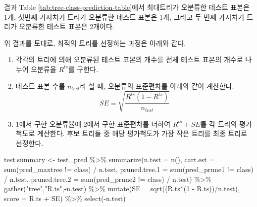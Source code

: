 \documentclass[
]{book}
\newenvironment{Shaded}{\begin{snugshade}}{\end{snugshade}}
\newcommand{\AttributeTok}[1]{\textcolor[rgb]{0.77,0.63,0.00}{#1}}
\newcommand{\DecValTok}[1]{\textcolor[rgb]{0.00,0.00,0.81}{#1}}
\newcommand{\FunctionTok}[1]{\textcolor[rgb]{0.00,0.00,0.00}{#1}}
\newcommand{\NormalTok}[1]{#1}
\newcommand{\OtherTok}[1]{\textcolor[rgb]{0.56,0.35,0.01}{#1}}
\newcommand{\SpecialCharTok}[1]{\textcolor[rgb]{0.00,0.00,0.00}{#1}}
\newcommand{\StringTok}[1]{\textcolor[rgb]{0.31,0.60,0.02}{#1}}
\providecommand{\tightlist}{%
  \setlength{\itemsep}{0pt}\setlength{\parskip}{0pt}}
\begin{document}
결과 Table \ref{tab:tree-class-prediction-table}에서 최대트리가 오분류한 테스트 표본은 1개, 첫번째 가지치기 트리가 오분류한 테스트 표본은 1개, 그리고 두 번째 가지치기 트리가 오분류한 테스트 표본은 2개이다.

위 결과를 토대로, 최적의 트리를 선정하는 과정은 아래와 같다.

\begin{enumerate}
\def\labelenumi{\arabic{enumi}.}
\tightlist
\item
  각각의 트리에 의해 오분류된 테스트 표본의 개수를 전체 테스트 표본의 개수로 나누어 오분류율 \(R^{ts}\)를 구한다.
\item
  테스트 표본 수를 \(n_{test}\)라 할 때, 오분류의 표준편차를 아래와 같이 계산한다.
  \[SE = \sqrt{\frac{R^{ts}(1 - R^{ts})}{n_{test}}}\]
\item
  1에서 구한 오분류율에 2에서 구한 표준편차를 더하여 \(R^{ts} + SE\)를 각 트리의 평가척도로 계산한다. 후보 트리들 중 해당 평가척도가 가장 작은 트리를 최종 트리로 선정한다.
\end{enumerate}

\begin{Shaded}
\begin{Highlighting}[]
\NormalTok{test.summary }\OtherTok{\textless{}{-}}\NormalTok{ test\_pred }\SpecialCharTok{\%\textgreater{}\%}
  \FunctionTok{summarize}\NormalTok{(}\AttributeTok{n.test =} \FunctionTok{n}\NormalTok{(),}
            \AttributeTok{cart.est =} \FunctionTok{sum}\NormalTok{(pred\_maxtree }\SpecialCharTok{!=}\NormalTok{ class) }\SpecialCharTok{/}\NormalTok{ n.test,}
            \AttributeTok{pruned.tree.1 =} \FunctionTok{sum}\NormalTok{(pred\_prune1 }\SpecialCharTok{!=}\NormalTok{ class) }\SpecialCharTok{/}\NormalTok{ n.test,}
            \AttributeTok{pruned.tree.2 =} \FunctionTok{sum}\NormalTok{(pred\_prune2 }\SpecialCharTok{!=}\NormalTok{ class) }\SpecialCharTok{/}\NormalTok{ n.test) }\SpecialCharTok{\%\textgreater{}\%}
  \FunctionTok{gather}\NormalTok{(}\StringTok{"tree"}\NormalTok{,}\StringTok{"R.ts"}\NormalTok{,}\SpecialCharTok{{-}}\NormalTok{n.test) }\SpecialCharTok{\%\textgreater{}\%}
  \FunctionTok{mutate}\NormalTok{(}\AttributeTok{SE =} \FunctionTok{sqrt}\NormalTok{((R.ts}\SpecialCharTok{*}\NormalTok{(}\DecValTok{1} \SpecialCharTok{{-}}\NormalTok{ R.ts))}\SpecialCharTok{/}\NormalTok{n.test),}
         \AttributeTok{score =}\NormalTok{ R.ts }\SpecialCharTok{+}\NormalTok{ SE) }\SpecialCharTok{\%\textgreater{}\%}
  \FunctionTok{select}\NormalTok{(}\SpecialCharTok{{-}}\NormalTok{n.test)}
\end{Highlighting}
\end{Shaded}
\end{document}
